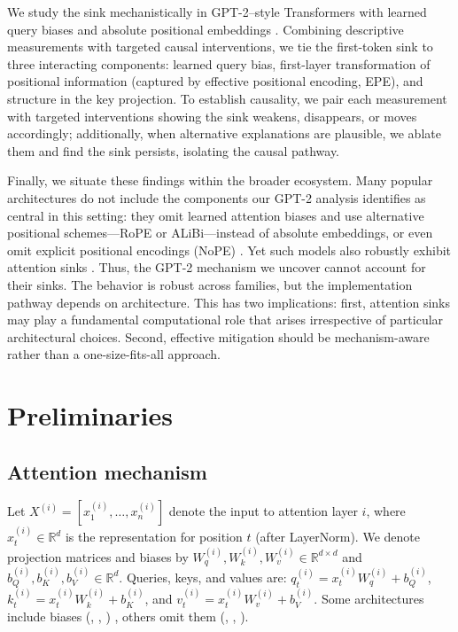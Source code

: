 \documentclass[11pt]{article}
\begin{document}
We study the sink mechanistically in GPT-2–style Transformers with learned query biases and absolute positional embeddings \citep{Radford2018ImprovingLU}. Combining descriptive measurements with targeted causal interventions, we tie the first-token sink to three interacting components: learned query bias, first-layer transformation of positional information (captured by effective positional encoding, EPE), and structure in the key projection. To establish causality, we pair each measurement with targeted interventions showing the sink weakens, disappears, or moves accordingly; additionally, 
when alternative explanations are plausible, we ablate them and find the 
sink persists, isolating the causal pathway.

Finally, we situate these findings within the broader ecosystem. Many popular architectures do not include the components our GPT-2 analysis identifies as central in this setting: they omit learned attention biases and use alternative positional schemes—RoPE or ALiBi—instead of absolute embeddings, or even omit explicit positional encodings (NoPE) \citep{touvron2023llama2,Chowdhery2022PaLMSL,su2021roformer,press2021train,Irie2019LanguageMW}. Yet such models also robustly exhibit attention sinks \citep{gu2025when,xiao2023efficient}. Thus, the GPT-2 mechanism we uncover cannot account for their sinks. The behavior is robust across families, but the implementation pathway depends on architecture. This has two implications: first, attention sinks may play a fundamental computational role that arises irrespective of particular architectural choices. Second, effective mitigation should be mechanism-aware rather than a one-size-fits-all approach.

\section{Preliminaries}
\subsection{Attention mechanism}
Let $X^{(i)}=[x_1^{(i)},\ldots,x_n^{(i)}]$ denote the input to attention layer $i$, where $x_t^{(i)}\in\mathbb{R}^{d}$ is the representation for position $t$ (after LayerNorm). We denote projection matrices and biases by $W_q^{(i)},W_k^{(i)},W_v^{(i)}\in\mathbb{R}^{d\times d}$ and $b_Q^{(i)},b_K^{(i)},b_V^{(i)}\in\mathbb{R}^{d}$. Queries, keys, and values are: $q_t^{(i)}=x_t^{(i)}W_q^{(i)} + b_Q^{(i)}$, $k_t^{(i)}=x_t^{(i)}W_k^{(i)} + b_K^{(i)}$, and $v_t^{(i)}=x_t^{(i)}W_v^{(i)} + b_V^{(i)}$. Some architectures include biases (\citet{Zhang2022OPTOP}, \citet{Yang2024Qwen2}, \citet{Zeng2024ChatGLMAF}) , others omit them (\citet{touvron2023llama2}, \citet{Dehghani2023ScalingVT}, \cite{Chowdhery2022PaLMSL}).
\end{document}
